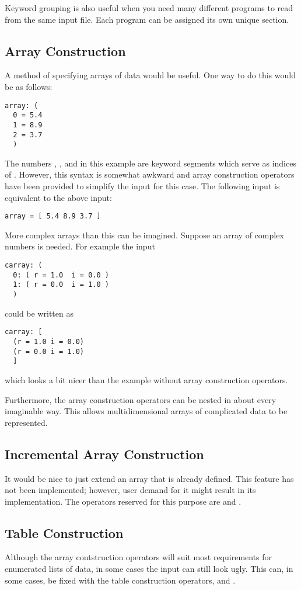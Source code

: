 Keyword grouping is also useful when you need many different
programs to read from the same input file.  Each program can
be assigned its own unique section.

\subsection{Array Construction}
A method of specifying arrays of data would be useful.  One way to
do this would be as follows:
\begin{verbatim}
array: (
  0 = 5.4
  1 = 8.9
  2 = 3.7
  )
\end{verbatim}
The numbers , , and  in this example are
keyword segments which serve as indices of .  However,
this syntax is somewhat awkward and array construction operators
have been provided to simplify the input for this case.
The following input is equivalent to the above input:
\begin{verbatim}
array = [ 5.4 8.9 3.7 ]
\end{verbatim}

More complex arrays than this can be imagined.  Suppose an array
of complex numbers is needed.   For example the input
\begin{verbatim}
carray: (
  0: ( r = 1.0  i = 0.0 )
  1: ( r = 0.0  i = 1.0 )
  )
\end{verbatim}
could be written as
\begin{verbatim}
carray: [
  (r = 1.0 i = 0.0)
  (r = 0.0 i = 1.0)
  ]
\end{verbatim}
which looks a bit nicer than the example without array construction
operators.

Furthermore, the array construction operators can be nested in about
every imaginable way.  This allows multidimensional arrays of complicated
data to be represented.

\subsection{Incremental Array Construction}
It would be nice to just extend an array that is already defined.
This feature has not been implemented; however, user demand
for it might result in its implementation.  The operators reserved for
this purpose are \lit{+[} and \lit{]}.

\subsection{Table Construction}
Although the array contstruction operators will suit most requirements
for enumerated lists of data, in some cases the input can still look
ugly.  This can, in some cases, be fixed with the table construction
operators, \lit{\{} and \lit{\}}.

